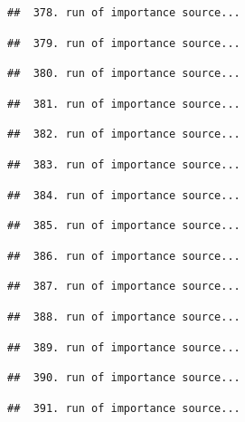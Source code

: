 \documentclass[
]{article}
\begin{document}
\begin{verbatim}
##  378. run of importance source...
\end{verbatim}

\begin{verbatim}
##  379. run of importance source...
\end{verbatim}

\begin{verbatim}
##  380. run of importance source...
\end{verbatim}

\begin{verbatim}
##  381. run of importance source...
\end{verbatim}

\begin{verbatim}
##  382. run of importance source...
\end{verbatim}

\begin{verbatim}
##  383. run of importance source...
\end{verbatim}

\begin{verbatim}
##  384. run of importance source...
\end{verbatim}

\begin{verbatim}
##  385. run of importance source...
\end{verbatim}

\begin{verbatim}
##  386. run of importance source...
\end{verbatim}

\begin{verbatim}
##  387. run of importance source...
\end{verbatim}

\begin{verbatim}
##  388. run of importance source...
\end{verbatim}

\begin{verbatim}
##  389. run of importance source...
\end{verbatim}

\begin{verbatim}
##  390. run of importance source...
\end{verbatim}

\begin{verbatim}
##  391. run of importance source...
\end{verbatim}
\end{document}
